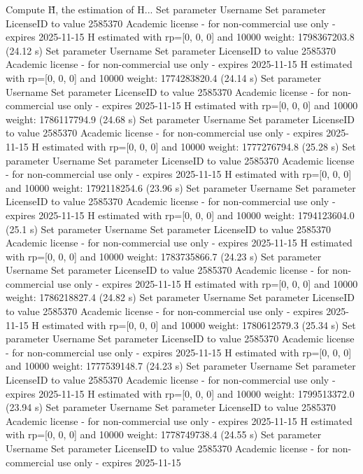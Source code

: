 Compute H̃, the estimation of H...
Set parameter Username
Set parameter LicenseID to value 2585370
Academic license - for non-commercial use only - expires 2025-11-15
  H estimated with rp=[0, 0, 0] and 10000 weight:  1798367203.8  (24.12 s)
Set parameter Username
Set parameter LicenseID to value 2585370
Academic license - for non-commercial use only - expires 2025-11-15
  H estimated with rp=[0, 0, 0] and 10000 weight:  1774283820.4  (24.14 s)
Set parameter Username
Set parameter LicenseID to value 2585370
Academic license - for non-commercial use only - expires 2025-11-15
  H estimated with rp=[0, 0, 0] and 10000 weight:  1786117794.9  (24.68 s)
Set parameter Username
Set parameter LicenseID to value 2585370
Academic license - for non-commercial use only - expires 2025-11-15
  H estimated with rp=[0, 0, 0] and 10000 weight:  1777276794.8  (25.28 s)
Set parameter Username
Set parameter LicenseID to value 2585370
Academic license - for non-commercial use only - expires 2025-11-15
  H estimated with rp=[0, 0, 0] and 10000 weight:  1792118254.6  (23.96 s)
Set parameter Username
Set parameter LicenseID to value 2585370
Academic license - for non-commercial use only - expires 2025-11-15
  H estimated with rp=[0, 0, 0] and 10000 weight:  1794123604.0  (25.1 s)
Set parameter Username
Set parameter LicenseID to value 2585370
Academic license - for non-commercial use only - expires 2025-11-15
  H estimated with rp=[0, 0, 0] and 10000 weight:  1783735866.7  (24.23 s)
Set parameter Username
Set parameter LicenseID to value 2585370
Academic license - for non-commercial use only - expires 2025-11-15
  H estimated with rp=[0, 0, 0] and 10000 weight:  1786218827.4  (24.82 s)
Set parameter Username
Set parameter LicenseID to value 2585370
Academic license - for non-commercial use only - expires 2025-11-15
  H estimated with rp=[0, 0, 0] and 10000 weight:  1780612579.3  (25.34 s)
Set parameter Username
Set parameter LicenseID to value 2585370
Academic license - for non-commercial use only - expires 2025-11-15
  H estimated with rp=[0, 0, 0] and 10000 weight:  1777539148.7  (24.23 s)
Set parameter Username
Set parameter LicenseID to value 2585370
Academic license - for non-commercial use only - expires 2025-11-15
  H estimated with rp=[0, 0, 0] and 10000 weight:  1799513372.0  (23.94 s)
Set parameter Username
Set parameter LicenseID to value 2585370
Academic license - for non-commercial use only - expires 2025-11-15
  H estimated with rp=[0, 0, 0] and 10000 weight:  1778749738.4  (24.55 s)
Set parameter Username
Set parameter LicenseID to value 2585370
Academic license - for non-commercial use only - expires 2025-11-15
